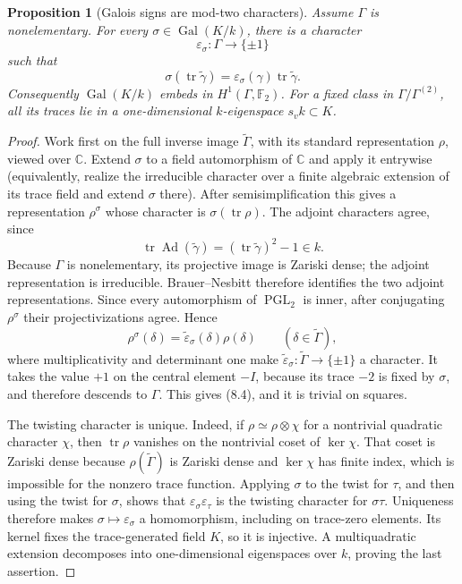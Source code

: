 \documentclass[11pt,reqno]{amsart}
\newtheorem{proposition}[theorem]{Proposition}
\theoremstyle{definition}
\theoremstyle{remark}
\newcommand{\C}{\mathbb C}
\newcommand{\F}{\mathbb F}
\newcommand{\Tr}{\operatorname{tr}}
\newcommand{\Gal}{\operatorname{Gal}}
\newcommand{\PGL}{\operatorname{PGL}}
\newcommand{\Ad}{\operatorname{Ad}}
\begin{document}
\begin{proposition}[Galois signs are mod-two characters]\label{prop:galois-signs}
Assume \(\Gamma\) is nonelementary.  For every
\(\sigma\in\Gal(K/k)\), there is a character
\[
 \varepsilon_\sigma:\Gamma\longrightarrow\{\pm1\}
\]
such that
\[
 \sigma(\Tr\widetilde\gamma)
 =\varepsilon_\sigma(\gamma)\Tr\widetilde\gamma.
\tag{8.4}
\]
Consequently \(\Gal(K/k)\) embeds in
\(H^1(\Gamma,\F_2)\).  For a fixed class in
\(\Gamma/\Gamma^{(2)}\), all its traces lie in a one-dimensional
\(k\)-eigenspace \(s_vk\subset K\).
\end{proposition}

\begin{proof}
Work first on the full inverse image \(\widetilde\Gamma\), with its standard
representation \(\rho\), viewed over \(\C\).  Extend \(\sigma\) to a field
automorphism of \(\C\) and apply it entrywise (equivalently, realize the
irreducible character over a finite algebraic extension of its trace field and
extend \(\sigma\) there).  After semisimplification this gives a representation
\(\rho^\sigma\) whose character is \(\sigma(\Tr\rho)\).  The adjoint
characters agree, since
\[
 \Tr\Ad(\widetilde\gamma)=(\Tr\widetilde\gamma)^2-1\in k.
\]
Because \(\Gamma\) is nonelementary, its projective image is Zariski dense;
the adjoint representation is irreducible.  Brauer--Nesbitt therefore
identifies the two adjoint representations.  Since every automorphism of
\(\PGL_2\) is inner, after conjugating \(\rho^\sigma\) their projectivizations
agree.  Hence
\[
 \rho^\sigma(\delta)=\widetilde\varepsilon_\sigma(\delta)\rho(\delta)
 \qquad(\delta\in\widetilde\Gamma),
\]
where multiplicativity and determinant one make
\(\widetilde\varepsilon_\sigma:\widetilde\Gamma\to\{\pm1\}\) a character.
It takes the value \(+1\) on the central element \(-I\), because its trace
\(-2\) is fixed by \(\sigma\), and therefore descends to \(\Gamma\).  This
gives (8.4), and it is trivial on squares.

The twisting character is unique.  Indeed, if \(\rho\simeq\rho\otimes\chi\)
for a nontrivial quadratic character \(\chi\), then \(\Tr\rho\) vanishes on
the nontrivial coset of \(\ker\chi\).  That coset is Zariski dense because
\(\rho(\widetilde\Gamma)\) is Zariski dense and \(\ker\chi\) has finite index,
which is impossible for the nonzero trace function.  Applying \(\sigma\) to
the twist for \(\tau\), and then using the twist for \(\sigma\), shows that
\(\varepsilon_\sigma\varepsilon_\tau\) is the twisting character for
\(\sigma\tau\).  Uniqueness therefore makes
\(\sigma\mapsto\varepsilon_\sigma\) a homomorphism, including on trace-zero
elements.  Its kernel fixes the
trace-generated field \(K\), so it is injective.  A multiquadratic extension
decomposes into one-dimensional eigenspaces over \(k\), proving the last
assertion.
\end{proof}
\end{document}
